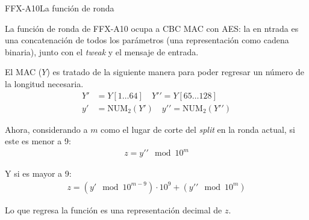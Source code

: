 \begin{frame}{FFX-A10}{La función de ronda}

  {
    La función de ronda de FFX-A10 ocupa a CBC MAC con AES: la en ntrada es una
    concatenación de todos los parámetros (una representación como cadena
    binaria), junto con el \textit{tweak} y el mensaje de entrada.

    El MAC ($ Y $) es tratado de la siguiente manera para poder regresar un
    número de la longitud necesaria.
    \begin{align*}
      Y\prime &= Y[1 \dots 64] \quad Y\prime\prime = Y[65 \dots 128] \\
      y\prime &= \text{NUM}_{2}(Y\prime) \quad y\prime\prime
        = \text{NUM}_{2}(Y\prime\prime)
    \end{align*}
  }

  {
    Ahora, considerando a $ m $ como el lugar de corte del \textit{split} en
    la ronda actual, si este es menor a 9:
    \begin{align*}
      z = y\prime\prime \mod 10^{m}
    \end{align*}

    Y si es mayor a 9:
    \begin{align*}
      z = (y\prime \mod 10^{m - 9}) \cdot 10^{9} + (y\prime\prime \mod 10^{m})
    \end{align*}

    Lo que regresa la función es una representación decimal de $ z $.
  }

\end{frame}